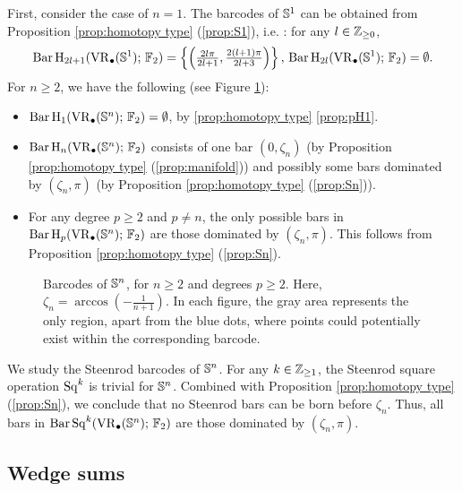 First, consider the case of $n=1$.
The barcodes of $\mathbb{S}^1$ can be obtained from Proposition \ref{prop:homotopy type} (\ref{prop:S1}), i.e. \cite[Theorem 7.4]{adamaszek2017vietoris}: for any $l\in \mathbb{Z}_{\geq 0}$,
\begin{equation}\label{eq:barc of S1}
	\operatorname{Bar} \operatorname{H}_{2l+1}(\operatorname{VR}_\bullet(\mathbb{S}^1);\,{\mathbb{F}_2})=\left\{\left(\tfrac{2l\pi}{2l+1},\tfrac{2(l+1)\pi}{2l+3}\right)\right\},\, \operatorname{Bar} \operatorname{H}_{2l}(\operatorname{VR}_\bullet(\mathbb{S}^1);\,{\mathbb{F}_2})=\emptyset.
\end{equation}
For $n\geq 2$, we have the following (see Figure \ref{fig:Sk}):
\begin{itemize}
	\item $\operatorname{Bar} \operatorname{H}_{1}(\operatorname{VR}_\bullet(\mathbb{S}^n);\,{\mathbb{F}_2})=\emptyset$, by \cref{prop:homotopy type} \cref{prop:pH1}.
	\item $\operatorname{Bar} \operatorname{H}_{n}(\operatorname{VR}_\bullet(\mathbb{S}^n);\,{\mathbb{F}_2})$ consists of one bar $(0,\zeta_n)$ (by Proposition \ref{prop:homotopy type} (\ref{prop:manifold})) and possibly some bars dominated by $(\zeta_n,\pi)$ (by Proposition \ref{prop:homotopy type} (\ref{prop:Sn})).
	\item For any degree $p\geq 2$ and $p\neq n$, the only possible bars in $\operatorname{Bar} \operatorname{H}_{p}(\operatorname{VR}_\bullet(\mathbb{S}^n);\,{\mathbb{F}_2})$ are those  dominated by  $(\zeta_n,\pi)$. This follows from  Proposition \ref{prop:homotopy type} (\ref{prop:Sn}).
\end{itemize}

\begin{figure}[ht]
	\centering
	
	\caption{
		Barcodes of $\mathbb{S}^n$, for $n\geq 2$ and degrees $p\geq 2$. Here, $\zeta_n=\arccos(-\frac{1}{n+1})$.
		In each figure, the gray area represents the only region, apart from the blue dots, where points could potentially exist within the corresponding barcode.}
	\label{fig:Sk}
\end{figure}

We study the Steenrod barcodes of $\mathbb{S}^n$. For any $k\in \mathbb{Z}_{\geq 1}$, the Steenrod square operation $\operatorname{Sq}^k$ is trivial for $\mathbb{S}^n$. Combined with Proposition \ref{prop:homotopy type} (\ref{prop:Sn}), we conclude that no Steenrod bars can be born before $\zeta_n$. Thus, all bars in $\operatorname{Bar}\operatorname{Sq}^{k}(\operatorname{VR}_\bullet(\mathbb{S}^n);\,{\mathbb{F}_2})$ are those dominated by  $(\zeta_n,\pi)$.

\subsection{Wedge sums}

